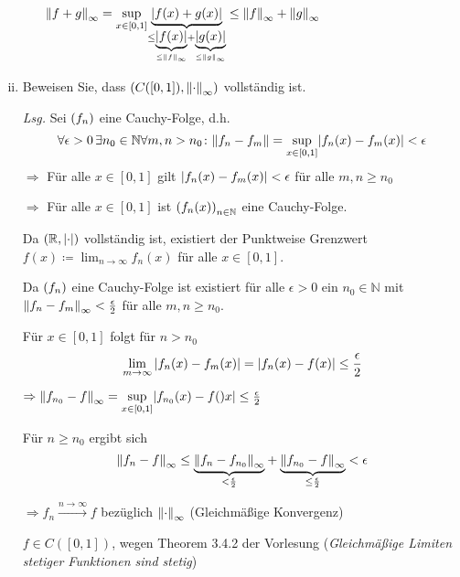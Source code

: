 \documentclass{article}
\begin{document}
\begin{enumerate}[(i)]
\begin{itemize}
    $\norm{f + g}_{\infty} = \underset{x \in [0, 1]}{\sup}
    \underset{\leq \underset{\leq \norm{f}_{\infty}}{\underbrace{\abs{f(x)}}} +
      \underset{\leq \norm{g}_{\infty}}{\underbrace{\abs{g(x)}}}}
    {\underbrace{\abs{f(x) + g(x)}}}
    \leq \norm{f}_{\infty} + \norm{g}_{\infty}$
  \end{itemize}

\item Beweisen Sie, dass $(C([0, 1]), \norm{\cdot}_{\infty})$ vollständig ist.

  \textit{Lsg.} Sei $\qty(f_n)$ eine Cauchy-Folge, d.h.
  \[
    \forall \epsilon > 0 \,\exists n_0 \in \mathbb{N} \forall m, n > n_0 \colon \norm{f_n - f_m}
    = \underset{x \in [0, 1]}{\sup} \abs{f_n(x) - f_m(x)} < \epsilon
  \]
  $\Rightarrow$ Für alle $x \in [0, 1]$ gilt $\abs{f_n(x) - f_m(x)} < \epsilon$ für alle $m, n \geq n_0$

  $\Rightarrow$ Für alle $x \in [0, 1]$ ist $\qty(f_n(x))_{n \in \mathbb{N}}$ eine Cauchy-Folge.

  Da $(\mathbb{R}, \abs{\cdot})$ vollständig ist, existiert der Punktweise Grenzwert
  $f(x) \coloneqq \lim_{n \to \infty} f_n(x)$ für alle $x \in [0, 1]$.

  Da $\qty(f_n)$ eine Cauchy-Folge ist existiert für alle $\epsilon > 0$ ein $n_0 \in \mathbb{N}$
  mit $\norm{f_n - f_m}_{\infty} < \frac{\epsilon}{2}$ für alle $m, n \geq n_0$.

  Für $x \in [0, 1]$ folgt für $n > n_0$
  \[
    \lim_{m \to \infty} \abs{f_n(x) - f_m(x)} = \abs{f_n(x) - f(x)} \leq \frac{\epsilon}{2}
  \]

  $\Rightarrow \norm{f_{n_0} - f}_{\infty} =
  \underset{x \in [0, 1]}{\sup} \abs{f_{n_0} (x) - f()x}
  \leq \frac{\epsilon}{2}$

  Für $n \geq n_0$ ergibt sich
  \[
    \norm{f_n - f}_{\infty} \leq \underset{< \frac{\epsilon}{2}}{\underbrace{\norm{f_n - f_{n_0}}_{\infty}}} +
    \underset{\leq \frac{\epsilon}{2}}{\underbrace{\norm{f_{n_0} - f}_{\infty}}} < \epsilon
  \]

  $\Rightarrow f_n \overset{n \to \infty}{\longrightarrow} f$ bezüglich $\norm{\cdot}_{\infty}$ (Gleichmäßige Konvergenz)

  $f \in C([0, 1])$, wegen Theorem 3.4.2 der Vorlesung (\textit{Gleichmäßige Limiten stetiger Funktionen sind stetig})
\end{enumerate}
\end{document}
